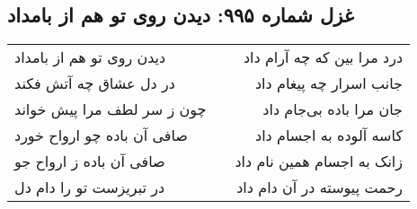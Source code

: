 \begin{center}
\section*{غزل شماره ۹۹۵: دیدن روی تو هم از بامداد}
\label{sec:0995}
\begin{longtable}{l p{0.5cm} r}
دیدن روی تو هم از بامداد
&&
درد مرا بین که چه آرام داد
\\
در دل عشاق چه آتش فکند
&&
جانب اسرار چه پیغام داد
\\
چون ز سر لطف مرا پیش خواند
&&
جان مرا باده بی‌جام داد
\\
صافی آن باده چو ارواح خورد
&&
کاسه آلوده به اجسام داد
\\
صافی آن باده ز ارواح جو
&&
زانک به اجسام همین نام داد
\\
در تبریزست تو را دام دل
&&
رحمت پیوسته در آن دام داد
\\
\end{longtable}
\end{center}
